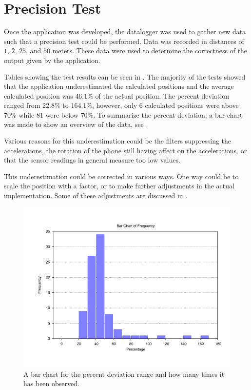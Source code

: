 \section{Precision Test}
Once the application was developed, the datalogger was used to gather new data such that a precision test could be performed.
Data was recorded in distances of $1$, $2$, $25$, and $50$ meters.
These data were used to determine the correctness of the output given by the application.

Tables showing the test results can be seen in .
The majority of the tests showed that the application underestimated the calculated positions and the average calculated position was $46.1\%$ of the actual position.
The percent deviation ranged from $22.8\%$ to $164.1\%$, however, only $6$ calculated positions were above $70\%$ while $81$ were below $70\%$.
To summarize the percent deviation, a bar chart was made to show an overview of the data, see .

Various reasons for this underestimation could be the filters suppressing the accelerations, the rotation of the phone still having affect on the accelerations, or that the sensor readings in general measure too low values.

This underestimation could be corrected in various ways.
One way could be to scale the position with a factor, or to make further adjustments in the actual implementation.
Some of these adjustments are discussed in .

\begin{figure}[H]
	\centering
	\includegraphics[scale=0.5, trim = 0cm 2cm 0cm 2cm, clip]{media/gnuplot/barchart.pdf}
	\caption{A bar chart for the percent deviation range and how many times it has been observed.}
	\label{figure:acc-histo}
\end{figure}